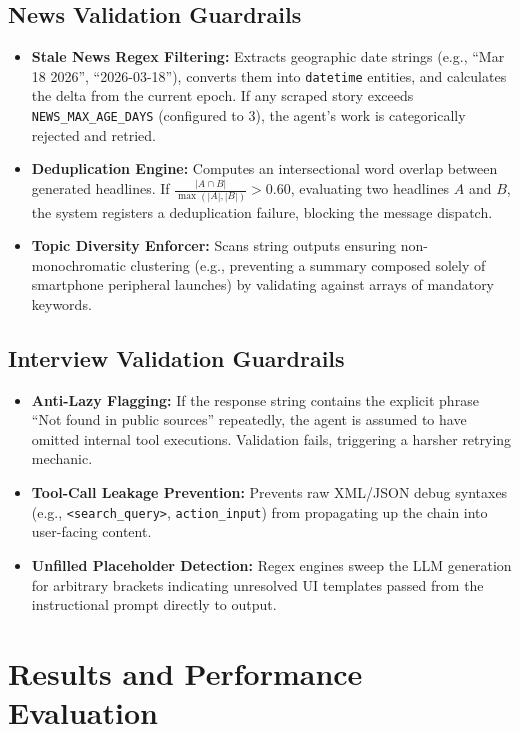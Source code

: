 \documentclass[conference]{IEEEtran}
\begin{document}
\subsection{News Validation Guardrails}
\begin{itemize}
    \item \textbf{Stale News Regex Filtering:} Extracts geographic date strings (e.g., ``Mar 18 2026'', ``2026-03-18''), converts them into \texttt{datetime} entities, and calculates the delta from the current epoch. If any scraped story exceeds \texttt{NEWS\_MAX\_AGE\_DAYS} (configured to 3), the agent's work is categorically rejected and retried.
    \item \textbf{Deduplication Engine:} Computes an intersectional word overlap between generated headlines. If $\frac{|A \cap B|}{\max(|A|, |B|)} > 0.60$, evaluating two headlines $A$ and $B$, the system registers a deduplication failure, blocking the message dispatch.
    \item \textbf{Topic Diversity Enforcer:} Scans string outputs ensuring non-monochromatic clustering (e.g., preventing a summary composed solely of smartphone peripheral launches) by validating against arrays of mandatory keywords.
\end{itemize}

\subsection{Interview Validation Guardrails}
\begin{itemize}
    \item \textbf{Anti-Lazy Flagging:} If the response string contains the explicit phrase ``Not found in public sources'' repeatedly, the agent is assumed to have omitted internal tool executions. Validation fails, triggering a harsher retrying mechanic.
    \item \textbf{Tool-Call Leakage Prevention:} Prevents raw XML/JSON debug syntaxes (e.g., \verb|<search_query>|, \verb|action_input|) from propagating up the chain into user-facing content.
    \item \textbf{Unfilled Placeholder Detection:} Regex engines sweep the LLM generation for arbitrary brackets indicating unresolved UI templates passed from the instructional prompt directly to output.
\end{itemize}

\section{Results and Performance Evaluation}
\end{document}
